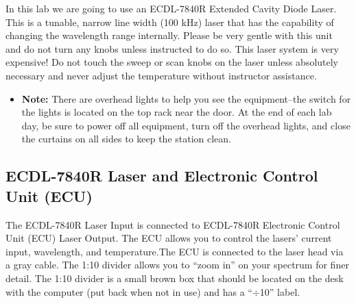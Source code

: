 \documentclass{../lab}
\begin{document}
\newpage

In this lab we are going to use an ECDL-7840R Extended Cavity Diode Laser. This is a tunable, narrow line width (100 kHz) laser that has the capability of changing the wavelength range internally. Please be very gentle with this unit and do not turn any knobs unless instructed to do so. This laser system is very expensive! Do not touch the sweep or scan knobs on the laser unless absolutely necessary and never adjust the temperature without instructor assistance.

\begin{itemize}
    \item \textbf{Note:} There are overhead lights to help you see the equipment--the switch for the lights is located on the top rack near the door. At the end of each lab day, be sure to power off all equipment, turn off the overhead lights, and close the curtains on all sides to keep the station clean.

\end{itemize}

\subsection{ECDL-7840R Laser and Electronic Control Unit (ECU)}
\label{subsec:ECDL7840RLaser}

The ECDL-7840R Laser Input is connected to ECDL-7840R Electronic Control Unit (ECU) Laser Output. The ECU allows you to control the lasers' current input, wavelength, and temperature.The ECU is connected to the laser head via a gray cable. The 1:10 divider allows you to ``zoom in'' on your spectrum for finer detail. The 1:10 divider is a small brown box that should be located on the desk with the computer (put back when not in use) and has a ``$\div$10'' label.
\end{document}
